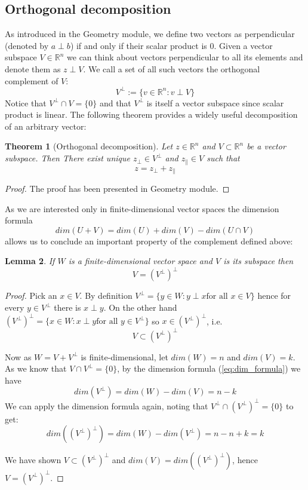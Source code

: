 \documentclass[a4paper]{article}
\theoremstyle{break}
\newtheorem{theorem}{Theorem}[section]
\newtheorem{lemma}[theorem]{Lemma}
\newcommand{\R}{\mathbb{R}}
\newcommand{\pll}{\parallel}
\begin{document}
\subsection{Orthogonal decomposition}
As introduced in the Geometry module, we define two vectors as perpendicular (denoted by $ a \perp b$) if and only if their scalar product is 0. Given a vector subspace $V \in \R^n$ we can think about vectors perpendicular to all its elements and denote them as $z \perp V$. We call a set of all such vectors the orthogonal complement of $V$:
$$ V^\perp := \{ v \in \R^n : v \perp V\} $$
Notice that $V^\perp \cap V = \{0\}$ and that $V^\perp$ is itself a vector subspace since scalar product is linear. The following theorem provides a widely useful decomposition of an arbitrary vector:

\begin{theorem}[Orthogonal decomposition] \label{thm:projection}
    Let $z \in \R^n$ and $V \subset \R^n$ be a vector subspace. Then
    There exist unique $z_\perp \in V^\perp$ and $z_\pll \in V$ such that  
    \begin{equation}
        z = z_\perp + z_\pll
    \end{equation}
\end{theorem}

\begin{proof}
    The proof has been presented in Geometry module.
\end{proof}

As we are interested only in finite-dimensional vector spaces the dimension formula
\begin{equation}\label{eq:dim_formula}
    dim(U + V) = dim(U) + dim(V) - dim( U \cap V)
\end{equation}
allows us to conclude an important property of the complement defined above:

\begin{lemma}\label{lem:double_perp}
    If $W$ is a finite-dimensional vector space and $V$ is its subspace then
    $$ V = (V^\perp)^\perp $$
\end{lemma}

\begin{proof}
    Pick an $x \in V$. By definition $ V^\perp = \{ y \in W : y \perp x \text{for all } x \in V \}$ hence for every $y \in V^\perp $ there is $x \perp y$. On the other hand $ (V^\perp)^\perp = \{ x \in W : x \perp y \text{for all } y \in V^\perp \}$ so $x \in (V^\perp)^\perp$, i.e.
    $$ V \subset (V^\perp)^\perp$$

    Now as $W = V + V^\perp$ is finite-dimensional, let $dim(W) = n$ and $dim(V) = k$. 
    As we know that $V \cap V^\perp = \{0\}$, by the dimension formula (\ref{eq:dim_formula}) we have
    $$ dim(V^\perp) = dim(W) - dim(V) = n - k $$
    We can apply the dimension formula again, noting that $ V^\perp \cap (V^\perp)^\perp = \{0\} $ to get:
    $$ dim((V^\perp)^\perp) = dim(W) - dim(V^\perp) = n - n + k = k $$

    We have shown $ V \subset (V^\perp)^\perp$ and $ dim(V) = dim((V^\perp)^\perp)$,
    hence $ V = (V^\perp)^\perp$.
\end{proof}
\end{document}

